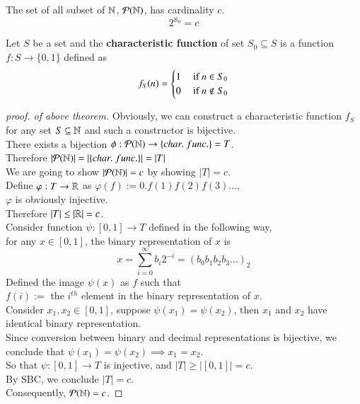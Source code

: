 \documentclass[10pt]{article}
\begin{document}
		\begin{theorem}
			The set of all subset of $\mathbb{N}$, $\mathcal{{P}}(\mathbb{N})$, has cardinality $c$.
			\[
				2^{\aleph_0} = c
			\] 
		\end{theorem}
		
		\begin{definition}
			Let $S$ be a set and the \textbf{characteristic function} of set $S_0 \subseteq S$ is a function $f: S \to \{0,1\}$ defined as 
			\[
				f_S(n) = \begin{cases}
					1 &\text{{ if }} n \in S_0 \\
					0 &\text{{ if }} n \notin S_0
				\end{cases}
			\]
		\end{definition}
		
		\begin{proof}[proof. of above theorem]
			Obviously, we can construct a characteristic function $f_S$ for any set $S \subseteq \mathbb{N}$ and such a constructor is bijective. \\
			There exists a bijection $\phi: \mathcal{{P}}(\mathbb{N}) \to \{char.\ func.\} = T$. \\
			Therefore $|\mathcal{{P}}(\mathbb{N})| = |\{char.\ func.\}| = |T|$ \\
			We are going to show $|\mathcal{{P}}(\mathbb{N})| = c$ by showing $|T| = c$. \\
			Define $\varphi: T \to \mathbb{R}$ as $\varphi(f) := 0.f(1)f(2)f(3)\dots$, \\
			$\varphi$ is obviously injective.\\
			Therefore $|T| \leq |\mathbb{R}| = c$. \\
			\newline 
			Consider function $\psi: [0, 1]\to T$ defined in the following way, \\
			for any $x \in [0,1]$, the binary representation of $x$ is 
			\[
				x = \sum_{i=0}^{\infty} b_i 2^{-i} = (b_0 b_1 b_2 b_3 \dots )_2
			\]
			Defined the image $\psi(x)$ as $f$ such that \\
			$f(i) := $ the $i^{th}$ element in the binary representation of $x$. \\
			Consider $x_1, x_2 \in [0,1]$, suppose $\psi(x_1) = \psi(x_2)$, then $x_1$ and $x_2$ have identical binary representation. \\
			Since conversion between binary and decimal representations is bijective, we conclude that $\psi(x_1) = \psi(x_2) \implies x_1 = x_2$. \\
			So that $\psi:[0,1]\to T$ is injective, and $|T| \geq |[0,1]| = c$. \\
			By SBC, we conclude $|T| = c$. \\
			Consequently, $\mathcal{{P}}(\mathbb{N}) = c$.
		\end{proof}
		
\end{document}
